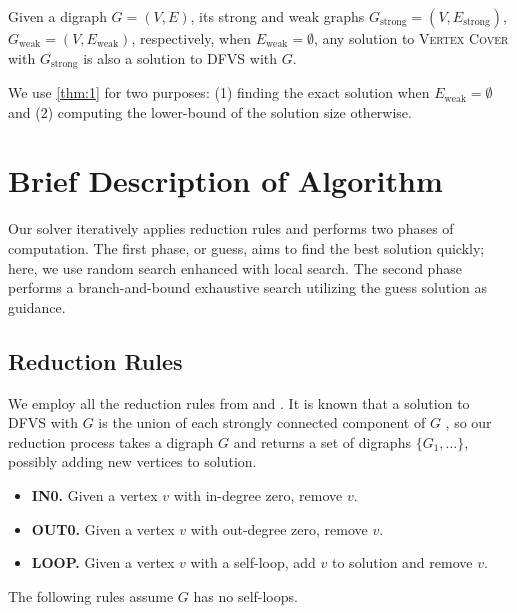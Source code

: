 \documentclass[a4paper,UKenglish,cleveref, autoref, thm-restate]{lipics-v2021}
\begin{document}
\begin{proposition}\label{thm:1}
    Given a digraph $G=(V,E)$, its strong and weak graphs $G_\text{strong}=(V,E_\text{strong})$,
    $G_\text{weak}=(V,E_\text{weak})$, respectively,
    when $E_\text{weak}=\emptyset$, any solution to \textnormal{\textsc{Vertex Cover}} with $G_\text{strong}$
    is also a solution to \textnormal{\textsc{DFVS}} with $G$.
\end{proposition}

We use \cref{thm:1} for two purposes: (1) finding the exact solution when $E_\text{weak}=\emptyset$ and
 (2) computing the lower-bound of the solution size otherwise.


\section{Brief Description of Algorithm}

Our solver iteratively applies reduction rules and performs two phases of computation.
The first phase, or guess, aims to find the best solution quickly;
 here, we use random search enhanced with local search.
The second phase performs a branch-and-bound exhaustive search utilizing the guess solution as guidance.

\subsection{Reduction Rules}

We employ all the reduction rules from \cite{levy_contraction_1988} and \cite{hen-ming_lin_computing_2000}.
It is known that a solution to \textsc{DFVS} with $G$ is the union of each strongly connected component of
 $G$ \cite{hen-ming_lin_computing_2000},
 so our reduction process takes a digraph $G$ and returns a set of digraphs $\{G_1,\ldots\}$,
 possibly adding new vertices to solution.

\begin{itemize}
    \item \textbf{IN0.} Given a vertex $v$ with in-degree zero, remove $v$.
    \item \textbf{OUT0.} Given a vertex $v$ with out-degree zero, remove $v$.
    \item \textbf{LOOP.} Given a vertex $v$ with a self-loop, add $v$ to solution and remove $v$.
\end{itemize}

The following rules assume $G$ has no self-loops.
\end{document}
